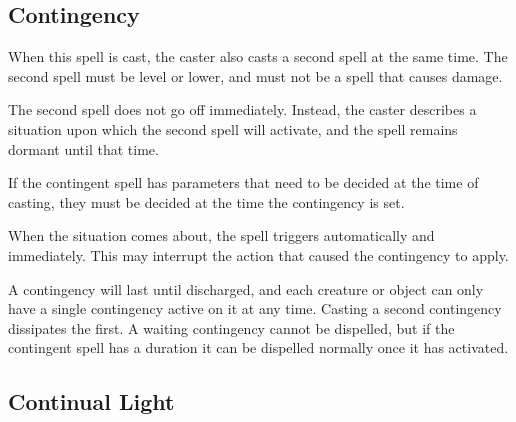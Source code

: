 \begin{multicols*}{2}
\subsection{Contingency}\label{spell:Contingency}

When this spell is cast, the caster also casts a second spell at the same time. The second spell must be  level or lower, and must not be a spell that causes damage.

The second spell does not go off immediately. Instead, the caster describes a situation upon which the second spell will activate, and the spell remains dormant until that time.

If the contingent spell has parameters that need to be decided at the time of casting, they must be decided at the time the contingency is set.

When the situation comes about, the spell triggers automatically and immediately. This may interrupt the action that caused the contingency to apply.


A contingency will last until discharged, and each creature or object can only have a single contingency active on it at any time. Casting a second contingency dissipates the first. A waiting contingency cannot be dispelled, but if the contingent spell has a duration it can be dispelled normally once it has activated.

\subsection{Continual Light}\label{spell:Continual Light}
\end{multicols*}
